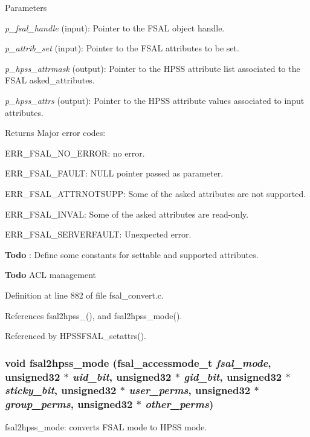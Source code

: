 \begin{DoxyParams}{Parameters}
\item[{\em p\_\-fsal\_\-handle}](input): Pointer to the FSAL object handle. \item[{\em p\_\-attrib\_\-set}](input): Pointer to the FSAL attributes to be set. \item[{\em p\_\-hpss\_\-attrmask}](output): Pointer to the HPSS attribute list associated to the FSAL asked\_\-attributes. \item[{\em p\_\-hpss\_\-attrs}](output): Pointer to the HPSS attribute values associated to input attributes.\end{DoxyParams}
\begin{DoxyReturn}{Returns}
Major error codes:
\begin{DoxyItemize}
\item ERR\_\-FSAL\_\-NO\_\-ERROR: no error.
\item ERR\_\-FSAL\_\-FAULT: NULL pointer passed as parameter.
\item ERR\_\-FSAL\_\-ATTRNOTSUPP: Some of the asked attributes are not supported.
\item ERR\_\-FSAL\_\-INVAL: Some of the asked attributes are read-\/only.
\item ERR\_\-FSAL\_\-SERVERFAULT: Unexpected error. 
\end{DoxyItemize}
\end{DoxyReturn}


\begin{Desc}
\item[{\bf Todo}]: Define some constants for settable and supported attributes. \end{Desc}


\begin{Desc}
\item[{\bf Todo}]ACL management \end{Desc}


Definition at line 882 of file fsal\_\-convert.c.

References fsal2hpss\_(), and fsal2hpss\_\-mode().

Referenced by HPSSFSAL\_\-setattrs().
\subsubsection[{fsal2hpss\_\-mode}]{\setlength{\rightskip}{0pt plus 5cm}void fsal2hpss\_\-mode (fsal\_\-accessmode\_\-t {\em fsal\_\-mode}, \/  unsigned32 $\ast$ {\em uid\_\-bit}, \/  unsigned32 $\ast$ {\em gid\_\-bit}, \/  unsigned32 $\ast$ {\em sticky\_\-bit}, \/  unsigned32 $\ast$ {\em user\_\-perms}, \/  unsigned32 $\ast$ {\em group\_\-perms}, \/  unsigned32 $\ast$ {\em other\_\-perms})}\label{fsal__convert_8c_a11565e39b6627a2e811d25b168eb7658}
fsal2hpss\_\-mode: converts FSAL mode to HPSS mode.


